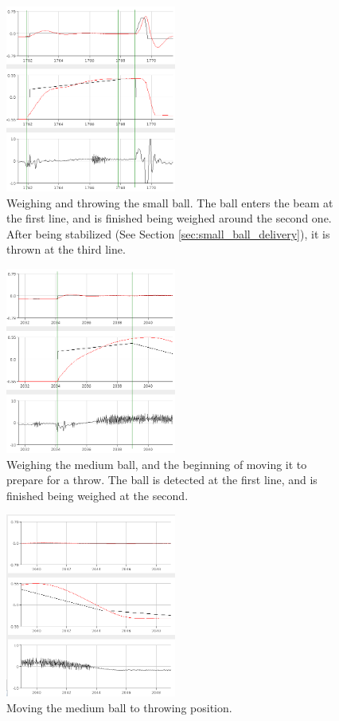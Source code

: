 \begin{figure}[h]
\centering
\includegraphics[width=0.5\textwidth]{figures/weighandthrowsmallball-crop.png}
\caption{Weighing and throwing the small ball. The ball enters the beam at the first line, and is finished being weighed around the second one. After being stabilized (See Section \ref{sec:small_ball_delivery}), it is thrown at the third line.}
\label{fig:weighandthrowsmallball}
\end{figure}

\begin{figure}[h]
\centering
\includegraphics[width=0.5\textwidth]{figures/weighmediumball-crop.png}
\caption{Weighing the medium ball, and the beginning of moving it to prepare for a throw. The ball is detected at the first line, and is finished being weighed at the second.}
\label{fig:weighmediumball}
\end{figure}

\begin{figure}[h]
\centering
\includegraphics[width=0.5\textwidth]{figures/movemediumball-crop.png}
\caption{Moving the medium ball to throwing position.}
\label{fig:movemediumball}
\end{figure}

